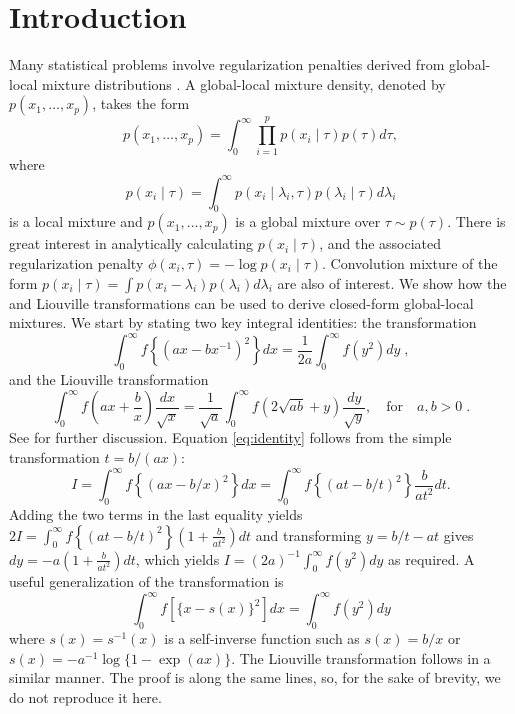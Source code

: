 \documentclass[lineno]{biometrika}
\begin{document}
\section{Introduction}
Many statistical problems involve regularization penalties derived from
global-local mixture distributions \citep{polson_data_2011,
hans2011comment,bhadra2015horseshoe+}. A global-local mixture density, denoted
by $p(x_1, \ldots, x_p)$, takes the form 
\begin{equation*}
  p(x_1, \ldots, x_p) = \int_{0}^{\infty}\prod_{i=1}^{p} p(x_i \mid \tau) 
  p(\tau) d\tau, 
\end{equation*}
where 
$$
p(x_i \mid \tau) = \int_{0}^{\infty} p(x_i \mid \lambda_i, \tau) 
p(\lambda_i \mid \tau) d\lambda_i
$$ 
is a local mixture and $p(x_1, \ldots, x_p)$ is a global mixture over 
$\tau \sim p(\tau)$. There is great interest in analytically calculating 
$p(x_i \mid \tau)$, and the associated regularization penalty 
$\phi(x_i, \tau) = -\log p(x_i \mid \tau)$.  Convolution mixture of the form 
$p(x_i \mid \tau) = \int p(x_i - \lambda_i) p(\lambda_i) d \lambda_i$ 
are also of interest. We show how the \CS{} and Liouville transformations can
be used to derive closed-form global-local mixtures.  We start by stating two
key integral identities: 
the \CS{} transformation 
\begin{equation}
  \int_0^\infty f \left\{ ( a x - b x^{-1} )^2 \right\} d x 
  = \frac{1}{2a} \int_0^\infty f(y^2) d y
  \;, 
  \label{eq:identity}
\end{equation}
and the Liouville transformation
\begin{equation}
  \int_{0}^{\infty} f\left(ax + \frac{b}{x} \right) \frac{dx}{\sqrt{x}} 
  = \frac{1}{\sqrt{a}} \int_{0}^{\infty} f\left( 2\sqrt{ab} + y \right) 
  \frac{dy}{\sqrt{y}}, \quad\text{for}\quad a, b >0
  \;. 
  \label{eq:liouville}
\end{equation}
See \cite{boros2006irresistible, baker2008probabilistic,
amdeberhan_cauchy-schlomilch_2010, jones_generating_2014} for further
discussion.  
Equation \eqref{eq:identity} follows from the simple transformation $t = b/(a x)$: 
\begin{equation*}
  I = \int_{0}^{\infty} f \left\{(ax - b/x)^2 \right\} dx 
  = \int_{0}^{\infty} f \left\{(at - b/t)^2 \right\} \frac{b}{a t^2} dt.
\end{equation*}
Adding the two terms in the last equality yields 
$2 I = \int_{0}^{\infty} f \left\{(at - b/t)^2 \right\} \left( 1+\frac{b}{a t^2} \right) dt$ 
and transforming $y = b/t - at$ gives $dy = -a (1+\frac{b}{a t^2}) dt$, which yields 
$I = (2a)^{-1} \int_{0}^{\infty} f(y^2) dy$ as required. A useful generalization
of the \CS{} transformation is
\begin{equation}
  \int_0^\infty f\left[ \{x-s(x)\}^2 \right] dx = 
  \int_0^\infty f( y^2 ) dy 
  \label{eq:gen}
\end{equation}
where $s(x)=s^{-1}(x)$ is a self-inverse function such as $s(x) = b/x$ or 
$s(x) = -a^{-1}\log\{1-\exp(a x)\}$. The Liouville transformation follows in a
similar manner.  The proof is along the same lines, so, for the sake
of brevity, we do not reproduce it here. 
\end{document}
